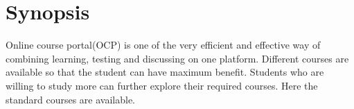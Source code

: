%
%
%
%

%
%

\lstset{
basicstyle=\small\ttfamily,
columns=flexible,
breaklines=true
}
%
%
%
%
%
%
%
%
%
%
%
%
%
%
%
% 
%
%
% 
%
%
%
%
%
%
%
%

%
%
%
\chapter*{Synopsis}
%

Online course portal(OCP) is one of the very efficient and effective way of combining learning, testing and discussing on one platform. Different courses are available so that  the student can have maximum benefit. Students who are willing to study more can further explore their required courses. Here the standard courses are available.

